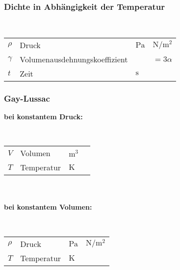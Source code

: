 \documentclass[a4paper, 10pt]{article}
\begin{document}
\subsubsection{Dichte in Abhängigkeit der Temperatur}
\begin{minipage}{0.45\textwidth}
  \\

\end{minipage}
\begin{minipage}{0.45\textwidth}

\begin{tabular}{llll}
$\rho$ & Druck & $\si{\pascal} $ & $\si{\newton\per\square\metre}$ \\
$\gamma $ & Volumenausdehnungskoeffizient &  & $= 3 \alpha$ \\
$t$ & Zeit & $\si{\second}$ & \\
\end{tabular}

\end{minipage}

\subsubsection{Gay-Lussac}
 
\textbf{bei konstantem Druck:} \\

\begin{minipage}{0.45\textwidth}
  \\

\end{minipage}
\begin{minipage}{0.45\textwidth}

\begin{tabular}{llll}
$V$ & Volumen & $\si{\cubic\meter}$ & \\
$T$ & Temperatur & $\si{\kelvin}$  &  \\
\end{tabular}

\end{minipage} 
\\\\
\textbf{bei konstantem Volumen:}\\

\begin{minipage}{0.45\textwidth}
  \\

\end{minipage}
\begin{minipage}{0.45\textwidth}

\begin{tabular}{llll}
$\rho$ & Druck & $\si{\pascal} $ & $\si{\newton\per\square\metre}$ \\
$T$ & Temperatur & $\si{\kelvin}$  &  \\
\end{tabular}

\end{minipage}
\end{document}
